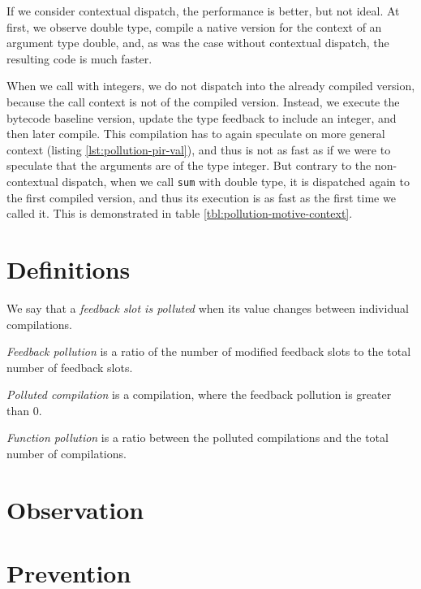 If we consider contextual dispatch, the performance is better, but not ideal. At first, we observe double type, compile a native version for the context of an argument type double, and, as was the case without contextual dispatch, the resulting code is much faster.

When we call with integers, we do not dispatch into the already compiled version, because the call context is not  of the compiled version. Instead, we execute the bytecode baseline version, update the type feedback to include an integer, and then later compile. This compilation has to again speculate on more general context (listing \ref{lst:pollution-pir-val}), and thus is not as fast as if we were to speculate that the arguments are of the type integer. But contrary to the non-contextual dispatch, when we call \texttt{sum} with double type, it is dispatched again to the first compiled version, and thus its execution is as fast as the first time we called it. This is demonstrated in table \ref{tbl:pollution-motive-context}.

\section{Definitions}

We say that a \textit{feedback slot is polluted} when its value changes between individual compilations.

\textit{Feedback pollution} is a ratio of the number of modified feedback slots to the total number of feedback slots.

\textit{Polluted compilation} is a compilation, where the feedback pollution is greater than 0.

\textit{Function pollution} is a ratio between the polluted compilations and the total number of compilations.

\section{Observation}

\section{Prevention}

